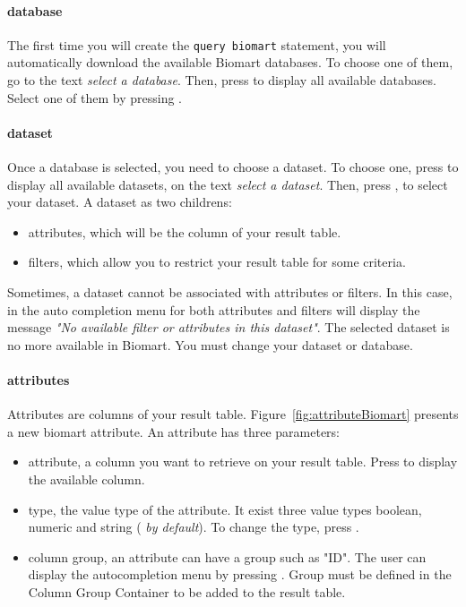\paragraph{database}
The first time you will create the \texttt{query biomart} statement, you will automatically download the available Biomart databases. To choose one of them, go to the text \textit{select a database}. Then, press \keys{\ctrl+\space} to display all available databases. Select one of them by pressing \keys{\return}. 


 \paragraph{dataset} 
Once a database is selected, you need to choose a dataset. To choose one, press \keys{\ctrl+\space} to display all available datasets, on the text \textit{select a dataset}. Then, press \keys{\return}, to select your dataset. \newline
A dataset as two childrens:
\begin{itemize}
\item attributes, which will be the column of your result table.
\item filters, which allow you to restrict your result table for some criteria.
\end{itemize}
\begin{remark}
Sometimes, a dataset cannot be associated with attributes or filters. In this case, in the auto completion menu for both attributes and filters will display the message \textit{"No available filter or attributes in this dataset"}. The selected dataset is no more available in Biomart. You must change your dataset or database. 
\end{remark}

\paragraph{attributes}
Attributes are columns of your result table. Figure~\ref{fig:attributeBiomart} presents a new biomart attribute. An attribute has three parameters:
\begin{itemize}
\item attribute, a column you want to retrieve on your result table. Press \keys{\ctrl+\space} to display the available column.
\item type, the value type of the attribute. It exist three  value types
boolean, numeric and string (\textit{ by default}). To change the type, press \keys{\ctrl+\space}.
\item column group, an attribute can have a group such as "ID". The user can display the autocompletion menu by pressing \keys{\ctrl+\space}. Group must be defined in the Column Group Container to be added to the result table.
\end{itemize}

